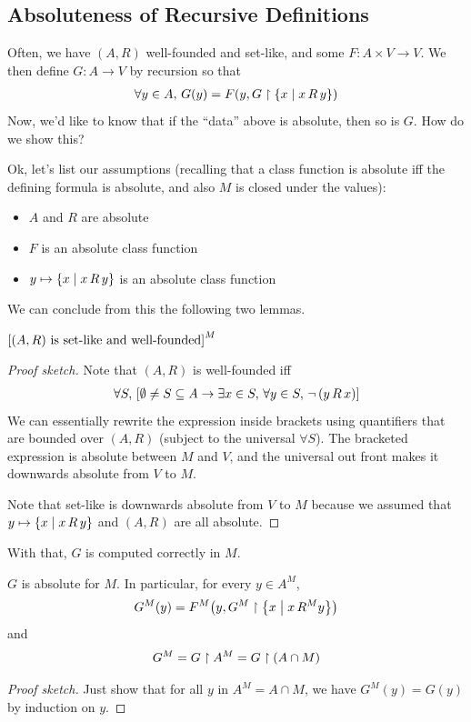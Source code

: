 \subsection{Absoluteness of Recursive Definitions} \label{Ch3:Subsec:Recursion}

Often, we have $(A, R)$ well-founded and set-like, and some $F : A \times V \to V$. We then define $G : A \to V$ by recursion so that
\begin{align*}
    \forall y \in A, \, G(y) = F\!\left( y, G \restriction \left\{ x \; \middle\vert \; x \, R \, y \right\} \right)
\end{align*}
Now, we'd like to know that if the ``data'' above is absolute, then so is $G$. How do we show this?

Ok, let's list our assumptions (recalling that a class function is absolute iff the defining formula is absolute, and also $M$ is closed under the values):
\begin{itemize}
    \item $A$ and $R$ are absolute
    \item $F$ is an absolute class function
    \item $y \mapsto \left\{ x \; \middle\vert \; x \, R \, y \right\}$ is an absolute class function
\end{itemize}
We can conclude from this the following two lemmas.

\begin{boxlemma}
    $\left[ \text{$(A, R)$ is set-like and well-founded} \right]^M$
\end{boxlemma}
\begin{proof}[Proof sketch]
    Note that $(A, R)$ is well-founded iff
    \begin{align*}
        \forall S, \, \left[ \emptyset \ne S \subseteq A \to \exists x \in S, \, \forall y \in S,\, \neg \left( y \, R \, x \right) \right]
    \end{align*}
    We can essentially rewrite the expression inside brackets using quantifiers that are bounded over $(A, R)$ (subject to the universal $\forall S$). The bracketed expression is absolute between $M$ and $V$, and the universal out front makes it downwards absolute from $V$ to $M$.

    Note that set-like is downwards absolute from $V$ to $M$ because we assumed that $y \mapsto \left\{ x \; \middle\vert \; x \, R \, y \right\}$ and $(A, R)$ are all absolute.
\end{proof}

With that, $G$ is computed correctly in $M$.

\begin{boxlemma}
    $G$ is absolute for $M$. In particular, for every $y \in A^M$,
    \begin{align*}
        G^M(y) = F^M\!\left( y, G^M \restriction \left\{ x \; \middle\vert \; x \, R^M y \right\} \right)
    \end{align*}
    and
    \begin{align*}
        G^M = G \restriction A^M = G \restriction \left( A \cap M \right)
    \end{align*}
\end{boxlemma}
\begin{proof}[Proof sketch]
    Just show that for all $y$ in $A^M = A \cap M$, we have $G^M(y) = G(y)$ by induction on $y$.
\end{proof}

